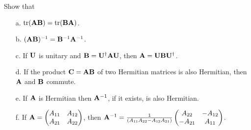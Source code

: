 \documentclass[a4paper]{book}
\newcounter{exercise}[chapter]
\newcommand\tr[1]{\mathrm{tr(#1)}}
\newcommand{\A}{{\bf A}}
\newcommand{\B}{{\bf B}}
\newcommand{\C}{{\bf C}}
\newcommand{\U}{{\bf U}}
\begin{document}
	\begin{exercise}
	Show that 
	\begin{enumerate}
	
	\item[a.] $\tr{\A\B} = \tr{\B\A}$.
	
	\item[b.] $(\A\B)^{-1}=\B^{-1}\A^{-1}$.
	
	\item[c.] If $\U$ is unitary and $\B = \U^\dagger \A \U$, then $\A = \U \B \U^\dagger$.
	
	\item[d.] If the product $\C=\A\B$ of two Hermitian matrices is also Hermitian, then $\A$ and $\B$ commute.
	
	\item[e.] If $\A$ is Hermitian then $\A^{-1}$, if it exists, is also Hermitian.
	
	\item[f.] If $\A=\begin{pmatrix} A_{11} & A_{12} \\ A_{21} & A_{22}	\end{pmatrix}$, then $\A^{-1}=\frac{1}{ ( A_{11} A_{22} - A_{12} A_{21} ) }\begin{pmatrix} A_{22} & -A_{12} \\ -A_{21} & A_{11}	\end{pmatrix}$.
	
	\end{enumerate}
	\end{exercise}
	
\end{document}
